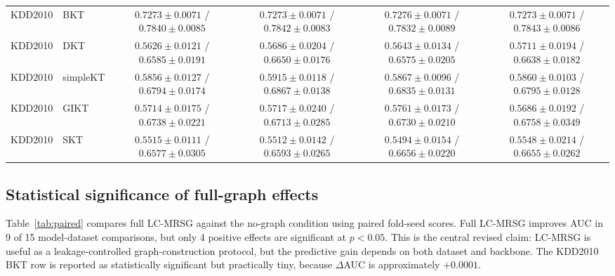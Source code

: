 \documentclass[11pt,a4paper]{article}
\newcommand{\LCMRSG}{LC-MRSG}
\begin{document}
\begin{landscape}
\begin{table}[p]
\begin{tabular}{llcccc}
KDD2010 & BKT & $0.7273\pm0.0071$ / $0.7840\pm0.0085$ & $0.7273\pm0.0071$ / $0.7842\pm0.0083$ & $0.7276\pm0.0071$ / $0.7832\pm0.0089$ & $0.7273\pm0.0071$ / $0.7843\pm0.0086$ \\
KDD2010 & DKT & $0.5626\pm0.0121$ / $0.6585\pm0.0191$ & $0.5686\pm0.0204$ / $0.6650\pm0.0176$ & $0.5643\pm0.0134$ / $0.6575\pm0.0205$ & $0.5711\pm0.0194$ / $0.6638\pm0.0182$ \\
KDD2010 & simpleKT & $0.5856\pm0.0127$ / $0.6794\pm0.0174$ & $0.5915\pm0.0118$ / $0.6867\pm0.0138$ & $0.5867\pm0.0096$ / $0.6835\pm0.0131$ & $0.5860\pm0.0103$ / $0.6795\pm0.0128$ \\
KDD2010 & GIKT & $0.5714\pm0.0175$ / $0.6738\pm0.0221$ & $0.5717\pm0.0240$ / $0.6713\pm0.0285$ & $0.5761\pm0.0173$ / $0.6730\pm0.0210$ & $0.5686\pm0.0192$ / $0.6758\pm0.0349$ \\
KDD2010 & SKT & $0.5515\pm0.0111$ / $0.6577\pm0.0305$ & $0.5512\pm0.0142$ / $0.6593\pm0.0265$ & $0.5494\pm0.0154$ / $0.6656\pm0.0220$ & $0.5548\pm0.0214$ / $0.6655\pm0.0262$ \\
\bottomrule
\end{tabular}
\end{table}
\end{landscape}

\subsection{Statistical significance of full-graph effects}
Table~\ref{tab:paired} compares full \LCMRSG{} against the no-graph condition using paired fold-seed scores. Full \LCMRSG{} improves AUC in 9 of 15 model-dataset comparisons, but only 4 positive effects are significant at $p<0.05$. This is the central revised claim: \LCMRSG{} is useful as a leakage-controlled graph-construction protocol, but the predictive gain depends on both dataset and backbone. The KDD2010 BKT row is reported as statistically significant but practically tiny, because $\Delta$AUC is approximately $+0.0001$.
\end{document}
